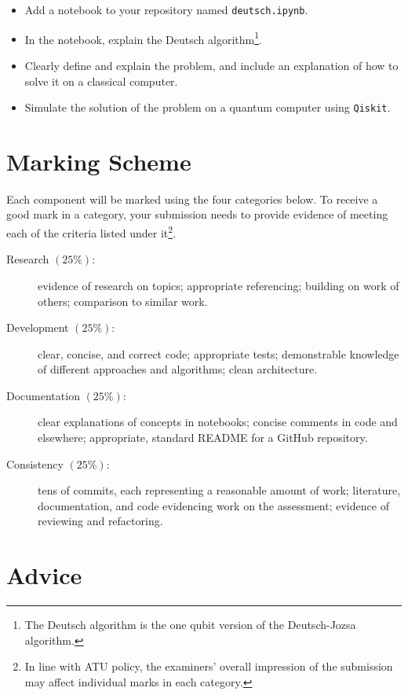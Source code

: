 \documentclass[a4paper]{tufte-handout}
\begin{document}
\begin{itemize}
  \item Add a notebook to your repository named \texttt{deutsch.ipynb}.
  \item In the notebook, explain the Deutsch algorithm\footnote{The Deutsch algorithm is the one qubit version of the Deutsch-Jozsa algorithm.}.
  \item Clearly define and explain the problem, and include an explanation of how to solve it on a classical computer.
  \item Simulate the solution of the problem on a quantum computer using \texttt{Qiskit}.
\end{itemize} 


\section{Marking Scheme}
Each component will be marked using the four categories below.
To receive a good mark in a category, your submission needs to provide evidence of meeting each of the criteria listed under it\footnote{In line with ATU policy, the examiners' overall impression of the submission may affect individual marks in each category.}.

\begin{description}
  \item[Research $(25\%)$:] evidence of research on topics; appropriate referencing; building on work of others; comparison to similar work.
  \item[Development $(25\%)$:] clear, concise, and correct code; appropriate tests; demonstrable knowledge of different approaches and algorithms; clean architecture.
  \item[Documentation $(25\%)$:] clear explanations of concepts in notebooks; concise comments in code and elsewhere; appropriate, standard README for a GitHub repository.
  \item[Consistency $(25\%)$:] tens of commits, each representing a reasonable amount of work; literature, documentation, and code evidencing work on the assessment; evidence of reviewing and refactoring.
\end{description}


\section{Advice}
\end{document}
